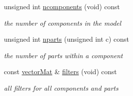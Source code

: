 \begin{DoxyCompactItemize}
unsigned int \hyperlink{classParts_ae46aae7dc84e1269f2df268e28dce5cf}{ncomponents} (void) const 
\begin{DoxyCompactList}\small\item\em the number of components in the model \end{DoxyCompactList}\item 
unsigned int \hyperlink{classParts_afd7ff7bce97afbb5a6f781c00e8b2cbc}{nparts} (unsigned int c) const 
\begin{DoxyCompactList}\small\item\em the number of parts within a component \end{DoxyCompactList}\item 
const \hyperlink{types_8hpp_a3207a7addcfa415d1c83622febcb1e9b}{vector\-Mat} \& \hyperlink{classParts_af3e4755656bcd59221ec3b91a79c0201}{filters} (void) const 
\begin{DoxyCompactList}\small\item\em all filters for all components and parts \end{DoxyCompactList}\end{DoxyCompactItemize}
